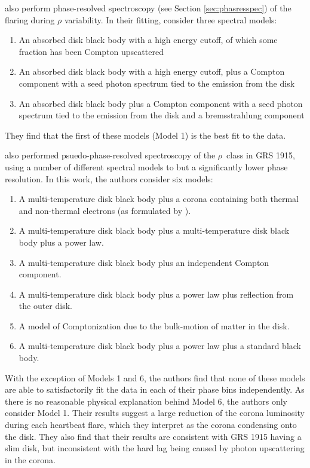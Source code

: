 \par \citealp{Neilsen_GRSModel} also perform phase-resolved spectroscopy (see Section \ref{sec:phasresspec}) of the flaring during $\rho$ variability.  In their fitting, \citealp{Neilsen_GRSModel} consider three spectral models:
\begin{enumerate}
\item An absorbed disk black body with a high energy cutoff, of which some fraction has been Compton upscattered
\item An absorbed disk black body with a high energy cutoff, plus a Compton component with a seed photon spectrum tied to the emission from the disk
\item An absorbed disk black body plus a Compton component with a seed photon spectrum tied to the emission from the disk and a bremsstrahlung component
\end{enumerate}
They find that the first of these models (Model 1) is the best fit to the data.
\par \citealp{Mineo_PhasRes} also performed psuedo-phase-resolved spectroscopy of the $\rho$\indexrho\ class in GRS 1915, using a number of different spectral models to \citealp{Neilsen_GRSModel} but a significantly lower phase resolution.  In this work, the authors consider six models:
\begin{enumerate}
\item A multi-temperature disk black body plus a corona containing both thermal and non-thermal electrons (as formulated by \citealp{Poutanen_Hybrid}).
\item A multi-temperature disk black body plus a multi-temperature disk black body plus a power law.
\item A multi-temperature disk black body plus an independent Compton component.
\item A multi-temperature disk black body plus a power law plus reflection from the outer disk.
\item A model of Comptonization due to the bulk-motion of matter in the disk.
\item A multi-temperature disk black body plus a power law plus a standard black body.
\end{enumerate}
With the exception of Models 1 and 6, the authors find that none of these models are able to satisfactorily fit the data in each of their phase bins independently.  As there is no reasonable physical explanation behind Model 6, the authors only consider Model 1.  Their results suggest a large reduction of the corona luminosity during each heartbeat flare, which they interpret as the corona condensing onto the disk.  They also find that their results are consistent with GRS 1915 having a slim disk, but inconsistent with the hard lag being caused by photon upscattering in the corona.
